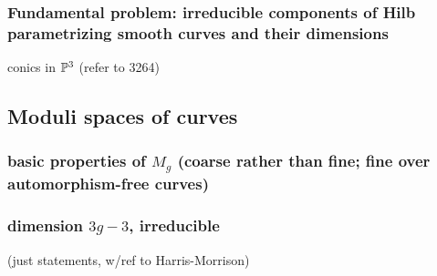 \subsubsection{Fundamental problem: irreducible components of Hilb parametrizing smooth curves and their dimensions}

\begin{example}
conics in $\PP^3$ (refer to 3264)
\end{example}

\subsection{Moduli spaces of curves}

\subsubsection{basic properties of $M_g$ (coarse rather than fine; fine over automorphism-free curves)}

\subsubsection{dimension $3g-3$, irreducible}  (just statements, w/ref to Harris-Morrison)



%